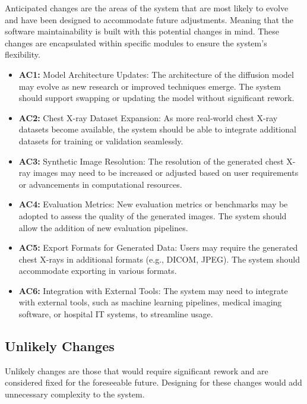 \documentclass[12pt, titlepage]{article}
\begin{document}
Anticipated changes are the areas of the system that are most likely to evolve and have been designed to accommodate future adjustments. Meaning that the software maintainability is built with this potential changes in mind. These changes are encapsulated within specific modules to ensure the system’s flexibility.

\begin{itemize}
  \item \textbf{AC1:} Model Architecture Updates:
  The architecture of the diffusion model may evolve as new research or improved techniques emerge. The system should support swapping or updating the model without significant rework.
  \item \textbf{AC2:} Chest X-ray Dataset Expansion:
  As more real-world chest X-ray datasets become available, the system should be able to integrate additional datasets for training or validation seamlessly.
  \item \textbf{AC3:} Synthetic Image Resolution:
  The resolution of the generated chest X-ray images may need to be increased or adjusted based on user requirements or advancements in computational resources.
  \item \textbf{AC4:} Evaluation Metrics:
  New evaluation metrics or benchmarks may be adopted to assess the quality of the generated images. The system should allow the addition of new evaluation pipelines.
  \item \textbf{AC5:} Export Formats for Generated Data:
  Users may require the generated chest X-rays in additional formats (e.g., DICOM, JPEG). The system should accommodate exporting in various formats.
  \item \textbf{AC6:} Integration with External Tools:
  The system may need to integrate with external tools, such as machine learning pipelines, medical imaging software, or hospital IT systems, to streamline usage.
\end{itemize}

\subsection{Unlikely Changes} \label{SecUchange}

Unlikely changes are those that would require significant rework and are considered fixed for the foreseeable future. Designing for these changes would add unnecessary complexity to the system.
\end{document}
